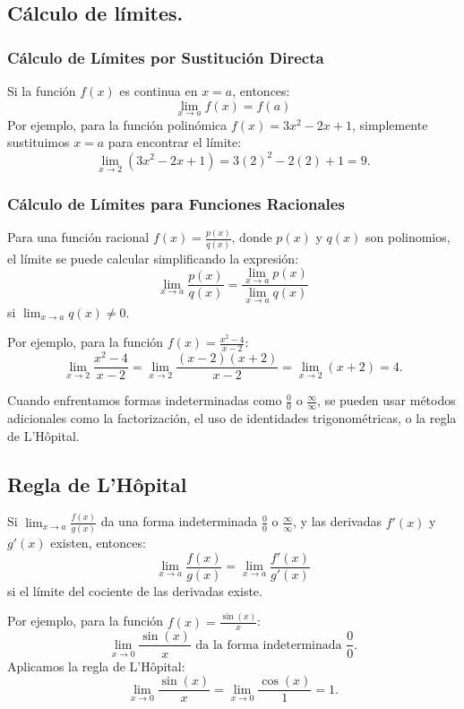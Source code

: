 \subsection{Cálculo de límites.}

\subsubsection{Cálculo de Límites por Sustitución Directa}

Si la función \( f(x) \) es continua en \( x = a \), entonces:
\[
\lim_{x \to a} f(x) = f(a)
\]
Por ejemplo, para la función polinómica \( f(x) = 3x^2 - 2x + 1 \), simplemente sustituimos \( x = a \) para encontrar el límite:
\[
\lim_{x \to 2} (3x^2 - 2x + 1) = 3(2)^2 - 2(2) + 1 = 9.
\]

\subsubsection{Cálculo de Límites para Funciones Racionales}

Para una función racional \( f(x) = \frac{p(x)}{q(x)} \), donde \( p(x) \) y \( q(x) \) son polinomios, el límite se puede calcular simplificando la expresión:
\[
\lim_{x \to a} \frac{p(x)}{q(x)} = \frac{\lim_{x \to a} p(x)}{\lim_{x \to a} q(x)}
\]
si \( \lim_{x \to a} q(x) \neq 0 \). 

Por ejemplo, para la función \( f(x) = \frac{x^2 - 4}{x - 2} \):
\[
\lim_{x \to 2} \frac{x^2 - 4}{x - 2} = \lim_{x \to 2} \frac{(x - 2)(x + 2)}{x - 2} = \lim_{x \to 2} (x + 2) = 4.
\]


Cuando enfrentamos formas indeterminadas como \( \frac{0}{0} \) o \( \frac{\infty}{\infty} \), se pueden usar métodos adicionales como la factorización, el uso de identidades trigonométricas, o la regla de L'Hôpital.

\subsection{Regla de L'Hôpital}

Si \( \lim_{x \to a} \frac{f(x)}{g(x)} \) da una forma indeterminada \( \frac{0}{0} \) o \( \frac{\infty}{\infty} \), y las derivadas \( f'(x) \) y \( g'(x) \) existen, entonces:
\[
\lim_{x \to a} \frac{f(x)}{g(x)} = \lim_{x \to a} \frac{f'(x)}{g'(x)}
\]
si el límite del cociente de las derivadas existe.

Por ejemplo, para la función \( f(x) = \frac{\sin(x)}{x} \):
\[
\lim_{x \to 0} \frac{\sin(x)}{x} \text{ da la forma indeterminada } \frac{0}{0}.
\]
Aplicamos la regla de L'Hôpital:
\[
\lim_{x \to 0} \frac{\sin(x)}{x} = \lim_{x \to 0} \frac{\cos(x)}{1} = 1.
\]


